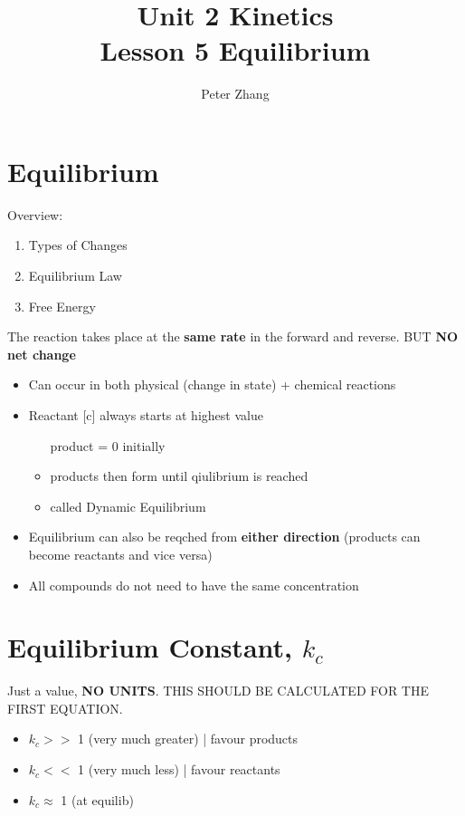 \documentclass{article}
\title{Unit 2 Kinetics\\Lesson 5 Equilibrium}
\author{Peter Zhang}
\begin{document}
\maketitle
\newpage
\tableofcontents
\newpage


\section{Equilibrium}
Overview:\begin{enumerate}\item Types of Changes \item Equilibrium Law\item Free Energy\end{enumerate}

The reaction takes place at the \textbf{same rate} in the forward and reverse. BUT \textbf{NO net change}


\begin{itemize}
\item Can occur in both physical (change in state) + chemical reactions
\item Reactant [c] always starts at highest value \begin{itemize} \item [product] = 0 initially\item products then form until qiulibrium is reached\item called Dynamic Equilibrium\end{itemize}
\item Equilibrium can also be reqched from \textbf{either direction} (products can become reactants and vice versa)
\item All compounds do not need to have the same concentration
\end{itemize}

\pagebreak

\section{Equilibrium Constant, $k_{c}$}
Just a value, \textbf{NO UNITS}. THIS SHOULD BE CALCULATED FOR THE FIRST EQUATION.

\begin{itemize}
\item $k_{c} >>$ 1 (very much greater) | favour products
\item $k_{c} <<$ 1 (very much less) | favour reactants
\item $k_{c} \approx $  1 (at equilib)
\end{itemize}
\end{document}

